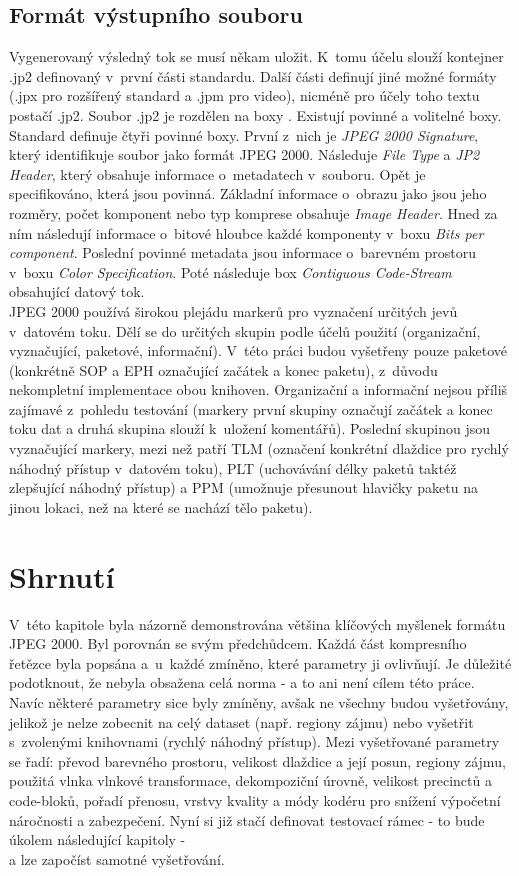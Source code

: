 \subsection*{Formát výstupního souboru}
Vygenerovaný výsledný tok se musí někam uložit. K~tomu účelu slouží kontejner .jp2 definovaný v~první části standardu. Další části definují jiné možné formáty (.jpx pro rozšířený standard a .jpm pro video), nicméně pro účely toho textu postačí .jp2.
Soubor .jp2 je rozdělen na boxy \cite{format}. Existují povinné a volitelné boxy. Standard definuje čtyři povinné boxy. První z~nich je \textit{JPEG 2000 Signature}, který identifikuje soubor jako formát JPEG 2000. Následuje \textit{File Type} a \textit{JP2 Header}, který obsahuje informace o~metadatech v~souboru. Opět je specifikováno, která jsou povinná. Základní informace o~obrazu jako jsou jeho rozměry, počet komponent nebo typ komprese obsahuje \textit{Image Header}. Hned za ním následují informace o~bitové hloubce každé komponenty v~boxu \textit{Bits per component}. Poslední povinné metadata jsou informace o~barevném prostoru v~boxu \textit{Color Specification}. Poté následuje box \textit{Contiguous Code-Stream} obsahující datový tok.\\
JPEG 2000 používá širokou plejádu markerů pro vyznačení určitých jevů v~datovém toku. Dělí se do určitých skupin podle účelů použití (organizační, vyznačující, paketové, informační). V~této práci budou vyšetřeny pouze paketové (konkrétně SOP a EPH označující začátek a konec paketu), z~důvodu nekompletní implementace obou knihoven. Organizační a informační nejsou příliš zajímavé z~pohledu testování (markery první skupiny označují začátek a konec toku dat a druhá skupina slouží k~uložení komentářů). Poslední skupinou jsou vyznačující markery, mezi než patří TLM (označení konkrétní dlaždice pro rychlý náhodný přístup v~datovém toku), PLT (uchovávání délky paketů taktéž zlepšující náhodný přístup) a PPM (umožnuje přesunout hlavičky paketu  na jinou lokaci, než na které se nachází tělo paketu).

\newpage
\section{Shrnutí}
V~této kapitole byla názorně demonstrována většina klíčových myšlenek formátu JPEG 2000. Byl porovnán se svým předchůdcem. Každá část kompresního řetězce byla popsána a~u~každé zmíněno, které parametry ji ovlivňují. Je důležité podotknout, že nebyla obsažena celá norma - a to ani není cílem této práce. Navíc některé parametry sice byly zmíněny, avšak ne všechny budou vyšetřovány, jelikož je nelze zobecnit na celý dataset (např. regiony zájmu) nebo vyšetřit s~zvolenými knihovnami (rychlý náhodný přístup). Mezi vyšetřované parametry se řadí: převod barevného prostoru, velikost dlaždice a její posun, regiony zájmu, použitá vlnka vlnkové transformace, dekompoziční úrovně, velikost precinctů a code-bloků, pořadí přenosu, vrstvy kvality a módy kodéru pro snížení výpočetní náročnosti a zabezpečení. Nyní si již stačí definovat testovací rámec - to bude úkolem následující kapitoly - \\a lze započíst samotné vyšetřování. 


